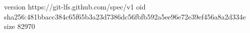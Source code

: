 version https://git-lfs.github.com/spec/v1
oid sha256:481bbacc384c65f65b3a23d7386dc56fbfb592a5ee96e72e39ef456a8a2d334e
size 82970
